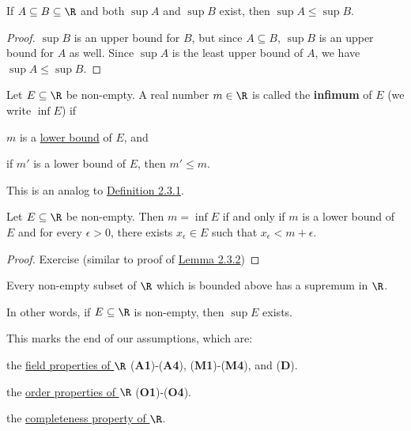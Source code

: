 \label{cd8e7c5}

If $A\subseteq B\subseteq\R$ and both $\sup A$ and $\sup B$ exist, then $\sup
A\leq\sup B$.

\begin{proof}
  $\sup B$ is an upper bound for $B$, but since $A\subseteq B$, $\sup B$ is an
  upper bound for $A$ as well. Since $\sup A$ is the least upper bound of $A$,
  we have $\sup A\leq\sup B$.
\end{proof}

\label{ff16df6}

Let $E\subseteq\R$ be non-empty. A real number $m\in\R$ is called the
\textbf{infimum} of $E$ (we write $\inf E$) if
\begin{enumerati}
  \item $m$ is a \href{e4698be}{lower bound} of $E$, and
  \item if $m'$ is a lower bound of $E$, then $m'\leq m$.
\end{enumerati}

This is an analog to \href{e6981e1}{Definition 2.3.1}.

\label{fec9bdb}

Let $E\subseteq\R$ be non-empty. Then $m=\inf E$ if and only if $m$ is a lower
bound of $E$ and for every $\epsilon>0$, there exists $x_\epsilon\in E$ such
that $x_\epsilon<m+\epsilon$.

\begin{proof}
  Exercise (similar to proof of \href{f77f162}{Lemma 2.3.2})
\end{proof}

\label{f330cf9}

Every non-empty subset of $\R$ which is bounded above has a supremum in $\R$.

In other words, if $E\subseteq\R$ is non-empty, then $\sup E$ exists.

 This marks the end of our assumptions, which are:

\begin{enumerati}
  \item the \href{bf61f02}{field properties of $\R$} (\textbf{A1})-(\textbf{A4}),
  (\textbf{M1})-(\textbf{M4}), and (\textbf{D}).
  \item the \href{d49c63e}{order properties of $\R$} (\textbf{O1})-(\textbf{O4}).
  \item the \href{f330cf9}{completeness property of $\R$}.
\end{enumerati}

